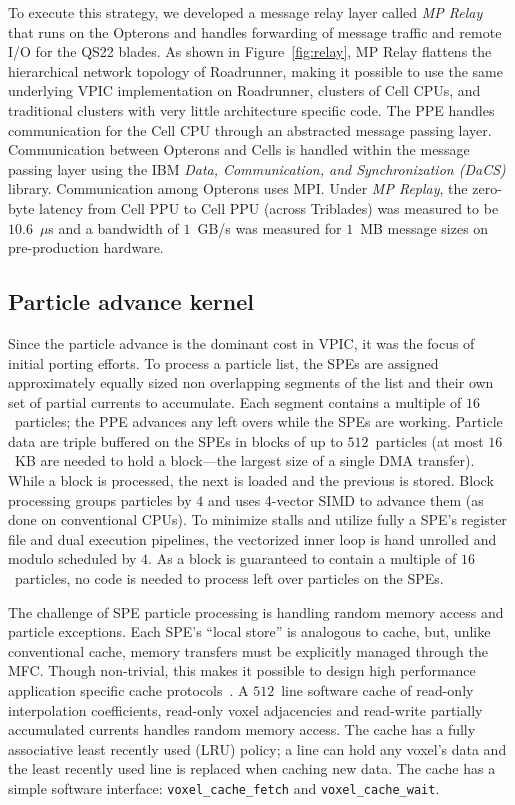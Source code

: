 \documentclass[journal,twoside]{IEEEtran}
\newcommand{\fig}[1]{Figure~\ref{fig:#1}}
\begin{document}
To execute this strategy, we developed a message relay layer called
\emph{MP Relay} that runs on the Opterons and handles forwarding of
message traffic and remote I/O for the QS22 blades.  As shown in
\fig{relay}, MP Relay flattens the hierarchical network topology of
Roadrunner, making it possible to use the same underlying VPIC
implementation on Roadrunner, clusters of Cell CPUs, and traditional
clusters with very little architecture specific code.  The PPE handles
communication for the Cell CPU through an abstracted message passing
layer.  Communication between Opterons and Cells is handled within the
message passing layer using the IBM \emph{Data, Communication, and
Synchronization (DaCS)} library.  Communication among Opterons uses
MPI.  Under \emph{MP Replay}, the zero-byte latency from Cell PPU to
Cell PPU (across Triblades) was measured to be $10.6$~$\mu$s and a
bandwidth of $1$~GB/s was measured for $1$~MB message sizes on
pre-production hardware.

\subsection{Particle advance kernel}

Since the particle advance is the dominant cost in VPIC, it was the
focus of initial porting efforts.  To process a particle list, the SPEs
are assigned approximately equally sized non overlapping segments of
the list and their own set of partial currents to accumulate.  Each
segment contains a multiple of $16$~particles; the PPE advances any
left overs while the SPEs are working.  Particle data are triple
buffered on the SPEs in blocks of up to $512$~particles (at most
$16$~KB are needed to hold a block---the largest size of a single DMA
transfer).  While a block is processed, the next is loaded and the
previous is stored.  Block processing groups particles by $4$ and uses
4-vector SIMD to advance them (as done on conventional CPUs).  To
minimize stalls and utilize fully a SPE's register file and dual
execution pipelines, the vectorized inner loop is hand unrolled and
modulo scheduled by $4$.  As a block is guaranteed to contain a
multiple of $16$~particles, no code is needed to process left over
particles on the SPEs.

The challenge of SPE particle processing is handling random memory
access and particle exceptions.  Each SPE's ``local store'' is
analogous to cache, but, unlike conventional cache, memory transfers
must be explicitly managed through the MFC.  Though non-trivial, this
makes it possible to design high performance application specific
cache protocols~\cite{Kahle_et_al_2005}.  A $512$~line software cache
of read-only interpolation coefficients, read-only voxel adjacencies
and read-write partially accumulated currents handles random memory
access.  The cache has a fully associative least recently used (LRU)
policy; a line can hold any voxel's data and the least recently used
line is replaced when caching new data.  The cache has a simple
software interface: \verb+voxel_cache_fetch+ and
\verb+voxel_cache_wait+.
\end{document}
